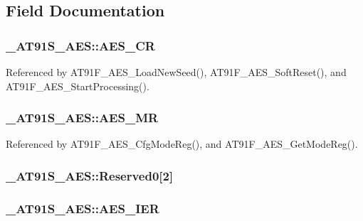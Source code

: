 \subsection{Field Documentation}
\hypertarget{struct__AT91S__AES_b3ba921e79e8215004773e86e4da0d9b}{
\subsubsection{ {\bf \_\-AT91S\_\-AES::AES\_\-CR}}}
\label{struct__AT91S__AES_b3ba921e79e8215004773e86e4da0d9b}




Referenced by AT91F\_\-AES\_\-LoadNewSeed(), AT91F\_\-AES\_\-SoftReset(), and AT91F\_\-AES\_\-StartProcessing().\hypertarget{struct__AT91S__AES_9aef7b71cde64f668f417acd5315db00}{
\subsubsection{ {\bf \_\-AT91S\_\-AES::AES\_\-MR}}}
\label{struct__AT91S__AES_9aef7b71cde64f668f417acd5315db00}




Referenced by AT91F\_\-AES\_\-CfgModeReg(), and AT91F\_\-AES\_\-GetModeReg().\hypertarget{struct__AT91S__AES_38e2b518a9e2e58cbce066c6834b24bd}{
\subsubsection{ {\bf \_\-AT91S\_\-AES::Reserved0}\mbox{[}2\mbox{]}}}
\label{struct__AT91S__AES_38e2b518a9e2e58cbce066c6834b24bd}


\hypertarget{struct__AT91S__AES_a34c05570476531c96390ff93049ad16}{
\subsubsection{ {\bf \_\-AT91S\_\-AES::AES\_\-IER}}}
\label{struct__AT91S__AES_a34c05570476531c96390ff93049ad16}




